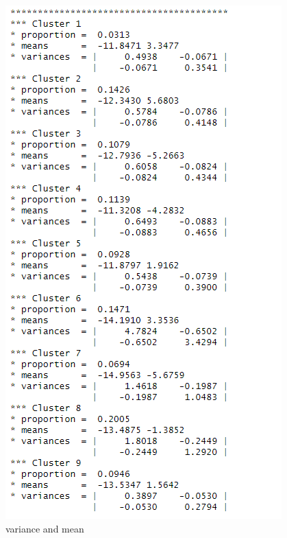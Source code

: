 \documentclass[11pt,a4paper,]{article}
\begin{document}
\begin{figure}

{\centering \includegraphics[width=1\linewidth]{image/variance} 

}

\caption{variance and mean}\label{fig:ninevar}
\end{figure}
\end{document}
